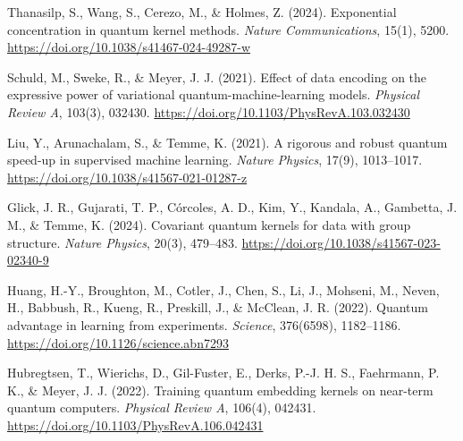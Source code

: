     Thanasilp, S., Wang, S., Cerezo, M., \& Holmes, Z. (2024).
    Exponential concentration in quantum kernel methods.
    \textit{Nature Communications}, 15(1), 5200.
    \url{https://doi.org/10.1038/s41467-024-49287-w}

    Schuld, M., Sweke, R., \& Meyer, J. J. (2021).
    Effect of data encoding on the expressive power of variational quantum-machine-learning models.
    \textit{Physical Review A}, 103(3), 032430.
    \url{https://doi.org/10.1103/PhysRevA.103.032430}

    Liu, Y., Arunachalam, S., \& Temme, K. (2021).
    A rigorous and robust quantum speed-up in supervised machine learning.
    \textit{Nature Physics}, 17(9), 1013--1017.
    \url{https://doi.org/10.1038/s41567-021-01287-z}

    Glick, J. R., Gujarati, T. P., C{\'{o}}rcoles, A. D., Kim, Y., Kandala, A., Gambetta, J. M., \& Temme, K. (2024).
    Covariant quantum kernels for data with group structure.
    \textit{Nature Physics}, 20(3), 479--483.
    \url{https://doi.org/10.1038/s41567-023-02340-9}

    Huang, H.-Y., Broughton, M., Cotler, J., Chen, S., Li, J., Mohseni, M., Neven, H., Babbush, R., Kueng, R., Preskill, J., \& McClean, J. R. (2022).
    Quantum advantage in learning from experiments.
    \textit{Science}, 376(6598), 1182--1186.
    \url{https://doi.org/10.1126/science.abn7293}

    Hubregtsen, T., Wierichs, D., Gil-Fuster, E., Derks, P.-J. H. S., Faehrmann, P. K., \& Meyer, J. J. (2022).
    Training quantum embedding kernels on near-term quantum computers.
    \textit{Physical Review A}, 106(4), 042431.
    \url{https://doi.org/10.1103/PhysRevA.106.042431}

